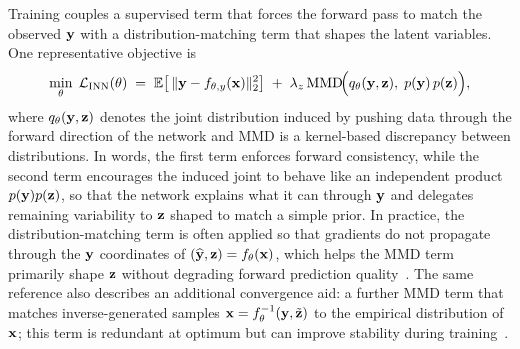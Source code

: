 Training couples a supervised term that forces the forward pass to match the observed $\mathbf{y}$ with a distribution-matching term that shapes the latent variables. One representative objective is
\begin{equation}
  \min_\theta\;
  \mathcal{L}_{\mathrm{INN}}(\theta)
  \;=\;
  \mathbb{E}\!\left[\,
    \|\mathbf{y}-f_{\theta,y}(\mathbf{x})\|_2^2
  \right]
  \;+\;
  \lambda_z\,
  \mathrm{MMD}\!\Big(q_\theta(\mathbf{y},\mathbf{z}),\; p(\mathbf{y})\,p(\mathbf{z})\Big),
  \label{eq:inn_loss}
\end{equation}
where $q_\theta(\mathbf{y},\mathbf{z})$ denotes the joint distribution induced by pushing data through the forward direction of the network and $\mathrm{MMD}$ is a kernel-based discrepancy between distributions. In words, the first term enforces forward consistency, while the second term encourages the induced joint to behave like an independent product $p(\mathbf{y})p(\mathbf{z})$, so that the network explains what it can through $\mathbf{y}$ and delegates remaining variability to $\mathbf{z}$ shaped to match a simple prior. In practice, the distribution-matching term is often applied so that gradients do not propagate through the $\mathbf{y}$ coordinates of $(\widehat{\mathbf{y}},\mathbf{z})=f_\theta(\mathbf{x})$, which helps the MMD term primarily shape $\mathbf{z}$ without degrading forward prediction quality~\cite{Ardizzone2019INN}. The same reference also describes an additional convergence aid: a further MMD term that matches inverse-generated samples $\mathbf{x}=f_\theta^{-1}(\mathbf{y},\tilde{\mathbf{z}})$ to the empirical distribution of $\mathbf{x}$; this term is redundant at optimum but can improve stability during training~\cite{Ardizzone2019INN}.

